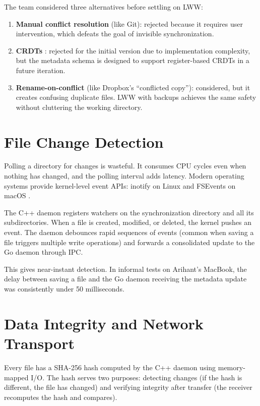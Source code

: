 The team considered three alternatives before settling on LWW:

\begin{enumerate}
    \item \textbf{Manual conflict resolution} (like Git): rejected because it requires user intervention, which defeats the goal of invisible synchronization.
    \item \textbf{CRDTs} \cite{shapiro2011}: rejected for the initial version due to implementation complexity, but the metadata schema is designed to support register-based CRDTs in a future iteration.
    \item \textbf{Rename-on-conflict} (like Dropbox's ``conflicted copy''): considered, but it creates confusing duplicate files. LWW with backups achieves the same safety without cluttering the working directory.
\end{enumerate}

\section{File Change Detection}

Polling a directory for changes is wasteful. It consumes CPU cycles even when nothing has changed, and the polling interval adds latency. Modern operating systems provide kernel-level event APIs: inotify on Linux \cite{inotify7} and FSEvents on macOS \cite{fsevents}.

The C++ daemon registers watchers on the synchronization directory and all its subdirectories. When a file is created, modified, or deleted, the kernel pushes an event. The daemon debounces rapid sequences of events (common when saving a file triggers multiple write operations) and forwards a consolidated update to the Go daemon through IPC.

This gives near-instant detection. In informal tests on Arihant's MacBook, the delay between saving a file and the Go daemon receiving the metadata update was consistently under 50 milliseconds.

\section{Data Integrity and Network Transport}

Every file has a SHA-256 hash \cite{fips1804} computed by the C++ daemon using memory-mapped I/O. The hash serves two purposes: detecting changes (if the hash is different, the file has changed) and verifying integrity after transfer (the receiver recomputes the hash and compares).

